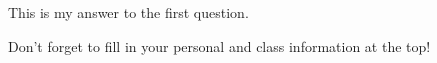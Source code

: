 \documentclass[11pt,largemargins]{homework}
\begin{document}
\maketitle

\question
  This is my answer to the first question.

  Don't forget to fill in your personal and class information at the top!
\end{document}
